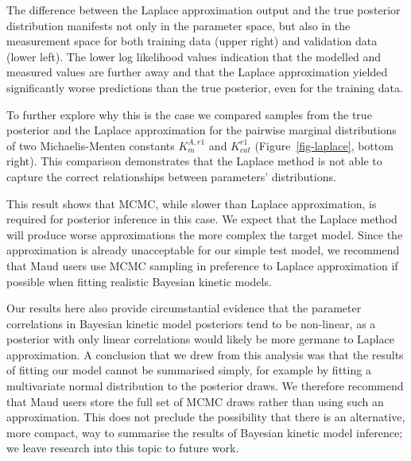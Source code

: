 \documentclass[journal=asbcd6,manuscript=article,layout=traditional]{achemso}
\begin{document}
The difference between the Laplace approximation output and the true
posterior distribution manifests not only in the parameter space, but
also in the measurement space for both training data (upper right) and
validation data (lower left). The lower log likelihood values indication
that the modelled and measured values are further away and that the
Laplace approximation yielded significantly worse predictions than the
true posterior, even for the training data.

To further explore why this is the case we compared samples from the
true posterior and the Laplace approximation for the pairwise marginal
distributions of two Michaelis-Menten constants \(K_{m}^{A,r1}\) and
\(K_{cat}^{r1}\) (Figure~\ref{fig-laplace}, bottom right). This
comparison demonstrates that the Laplace method is not able to capture
the correct relationships between parameters' distributions.

This result shows that MCMC, while slower than Laplace approximation, is
required for posterior inference in this case. We expect that the
Laplace method will produce worse approximations the more complex the
target model. Since the approximation is already unacceptable for our
simple test model, we recommend that Maud users use MCMC sampling in
preference to Laplace approximation if possible when fitting realistic
Bayesian kinetic models.

Our results here also provide circumstantial evidence that the parameter
correlations in Bayesian kinetic model posteriors tend to be non-linear,
as a posterior with only linear correlations would likely be more
germane to Laplace approximation. A conclusion that we drew from this
analysis was that the results of fitting our model cannot be summarised
simply, for example by fitting a multivariate normal distribution to the
posterior draws. We therefore recommend that Maud users store the full
set of MCMC draws rather than using such an approximation. This does not
preclude the possibility that there is an alternative, more compact, way
to summarise the results of Bayesian kinetic model inference; we leave
research into this topic to future work.
\end{document}
